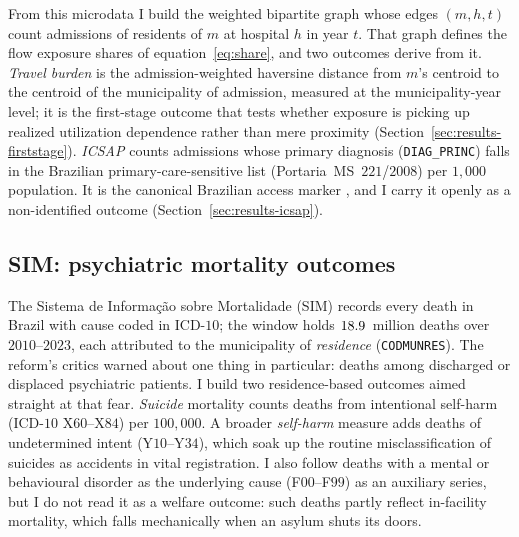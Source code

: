 From this microdata I build the weighted bipartite graph whose edges
$(m, h, t)$ count admissions of residents of $m$ at hospital $h$ in year
$t$. That graph defines the flow exposure shares of
equation~\eqref{eq:share}, and two outcomes derive from it. \emph{Travel
burden} is the admission-weighted haversine distance from $m$'s centroid
to the centroid of the municipality of admission, measured at the
municipality-year level; it is the first-stage outcome that tests whether
exposure is picking up realized utilization dependence rather than mere
proximity (Section~\ref{sec:results-firststage}). \emph{ICSAP} counts
admissions whose primary diagnosis (\texttt{DIAG\_PRINC}) falls in the
Brazilian primary-care-sensitive list (Portaria~MS~$221$/$2008$) per
$1{,}000$ population. It is the canonical Brazilian access marker
\citep{macinkoHarris2015, rochaSoares2010}, and I carry it openly as a
non-identified outcome (Section~\ref{sec:results-icsap}).

\subsection{SIM: psychiatric mortality outcomes}
\label{sec:data-sim}

The Sistema de Informação sobre Mortalidade (SIM) records every death in
Brazil with cause coded in ICD-$10$; the window holds $18.9$~million
deaths over $2010$--$2023$, each attributed to the municipality of
\emph{residence} (\texttt{CODMUNRES}). The reform's critics warned about
one thing in particular: deaths among discharged or displaced psychiatric
patients. I build two residence-based outcomes aimed straight at that
fear. \emph{Suicide} mortality counts deaths from intentional self-harm
(ICD-$10$ X$60$--X$84$) per $100{,}000$. A broader \emph{self-harm}
measure adds deaths of undetermined intent (Y$10$--Y$34$), which soak up
the routine misclassification of suicides as accidents in vital
registration. I also follow deaths with a mental or behavioural disorder
as the underlying cause (F$00$--F$99$) as an auxiliary series, but I do
not read it as a welfare outcome: such deaths partly reflect in-facility
mortality, which falls mechanically when an asylum shuts its doors.

